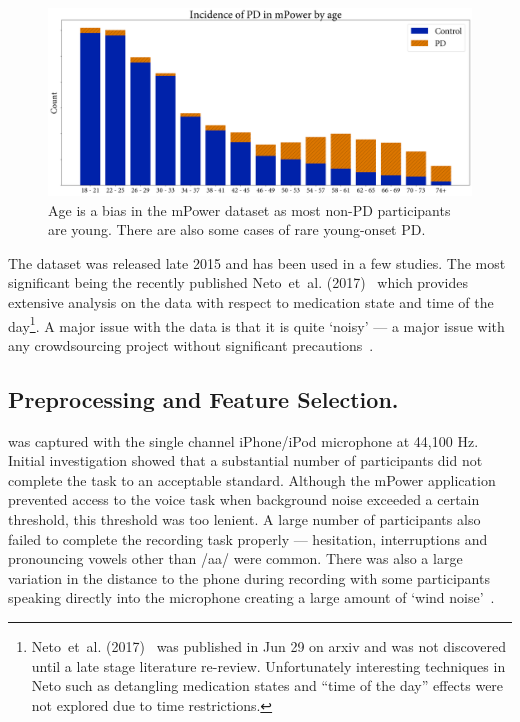 \documentclass[12pt, twoside]{book}
\renewcommand\emph[1]{\textit{\color{USred}{#1}}}
\begin{document}
\addtocounter{footnote}{-1}
\begin{figure}[h]
\label{mpowerage}
\centering\includegraphics[width=1\linewidth]{mpowerage.png}
\caption{Age is a bias in the mPower dataset as most non-PD participants are young. There are also some cases of rare young-onset PD\protect\footnotemark.}
\end{figure}

The dataset was released late 2015 and has been used in a few studies. The most significant being the recently published Neto~et~al. (2017)~\cite{mpowerneto2017analysis} which provides extensive analysis on the data with respect to medication state and time of the day\footnote{Neto~et~al. (2017)~\cite{mpowerneto2017analysis} was published in Jun 29 on arxiv and was not discovered until a late stage literature re-review. Unfortunately interesting techniques in Neto such as detangling medication states and ``time of the day'' effects were not explored due to time restrictions.}. A major issue with the data is that it is quite `noisy' --- a major issue with any crowdsourcing project without significant precautions~\cite{crowdsourcing}. 


\subsection{Preprocessing and Feature Selection.}
\label{mpowerprocess}
\emph{Vowel phonation} was captured with the single channel iPhone/iPod microphone at 44,100 Hz. Initial investigation showed that a substantial number of participants did not complete the task to an acceptable standard. Although the mPower application prevented access to the voice task when background noise exceeded a certain threshold, this threshold was too lenient. A large number of participants also failed to complete the recording task properly --- hesitation, interruptions and pronouncing vowels other than /aa/ were common. There was also a large variation in the distance to the phone during recording with some participants speaking directly into the microphone creating a large amount of `wind noise'~\cite{windnoise}. 
\end{document}
